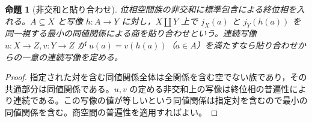 \documentclass[a5paper,10pt,dvipdfmx]{jsarticle}
\theoremstyle{definition}
\theoremstyle{plain}
\newtheorem{prop}[ruledef]{命題}
\begin{document}
\begin{prop}[非交和と貼り合わせ]\label{k262}
位相空間族の非交和に標準包含による終位相を入れる。$A\subseteq X$ と写像 $h\colon A\to Y$ に対し，$X\amalg Y$ 上で $j_X(a)$ と $j_Y(h(a))$ を同一視する最小の同値関係による商を貼り合わせという。連続写像 $u\colon X\to Z,v\colon Y\to Z$ が $u(a)=v(h(a))$（$a\in A$）を満たすなら貼り合わせからの一意の連続写像を定める。
\end{prop}
\begin{proof}
指定された対を含む同値関係全体は全関係を含む空でない族であり，その共通部分は同値関係である。$u,v$ の定める非交和上の写像は終位相の普遍性により連続である。この写像の値が等しいという同値関係は指定対を含むので最小の同値関係を含む。商空間の普遍性を適用すればよい。
\end{proof}
\end{document}
